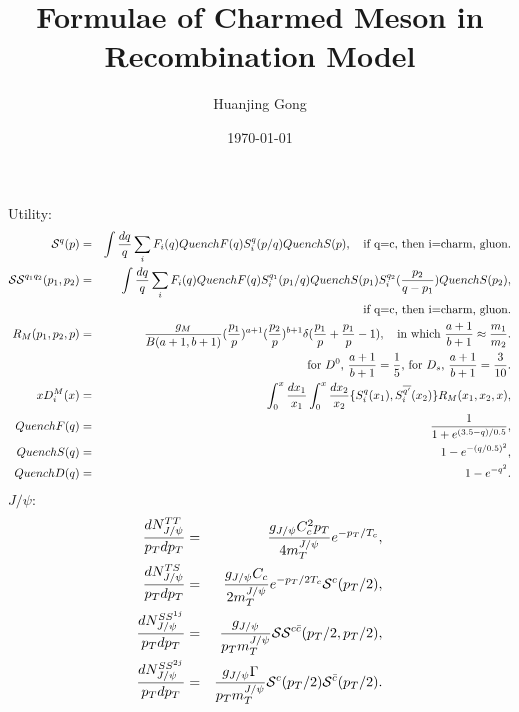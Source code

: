 \documentclass[onecolumn,aps,superscriptaddress,nofootinbib,floatfix]{revtex4}
\begin{document}
	
	\title{Formulae of Charmed Meson in Recombination Model}
	
	\author{Huanjing Gong}
	\date{\today}
	
	
	\pacs{}
	\keywords{}
	\maketitle

	Utility:
	\begin{eqnarray}
		\mathcal{S}^q(p)&=&\int{dq\over q} \sum_{i} F_i(q) QuenchF(q) S_i^q(p/q)QuenchS(p), \quad \text{if q=c, then i=charm, gluon}.\\
		\mathcal{SS}^{q_1 q_2}(p_1,p_2)&=&\int{dq\over q}  \sum_{i} F_i(q) QuenchF(q) S_i^{q_1}(p_1/q)QuenchS(p_1) S_i^{q_2}({p_2 \over q-p_1})QuenchS(p_2), \\
		&& \text{if q=c, then i=charm, gluon}.\nonumber \\
		R_M(p_1,p_2,p)&=&{g_M \over B(a+1,b+1)}({p_1 \over p})^{a+1} ({p_2 \over p})^{b+1} \delta({p_1 \over p}+{p_1 \over p}-1),\quad \text{in which }{a+1 \over b+1}\approx {m_1 \over m_2}. \\
		&& \text{for $D^0$, ${a+1 \over b+1}={1\over 5}$, for $D_s$, ${a+1 \over b+1}={3\over 10}$}.\nonumber \\
		xD_i^M(x)&=&\int_0^x {dx_1 \over x_1}\int_0^x {dx_2 \over x_2} \{S_i^q(x_1),S_i^{\overline{q'}} (x_2)\}R_M(x_1,x_2,x),\\
		QuenchF(q)&=&{1 \over 1+e^{(3.5-q)/0.5}},\\
		QuenchS(q)&=&1-e^{-(q/0.5)^2},\\
		QuenchD(q)&=&1-e^{-q^2}.
	\end{eqnarray}
	$J/\psi$:
	\begin{eqnarray}
		\frac{dN^{TT}_{J/\psi}}{p_Tdp_T}&=&{g_{J/\psi}C_c^2 p_T \over 4m_T^{J/\psi}}e^{-p_T/T_c}, \\
		\frac{dN^{TS}_{J/\psi}}{p_Tdp_T}&=&{g_{J/\psi}C_c \over 2m_T^{J/\psi}}e^{-p_T/2T_c}\mathcal{S}^c(p_T/2),\\
		\frac{dN^{SS^{1j}}_{J/\psi}}{p_Tdp_T}&=&{g_{J/\psi} \over p_T m_T^{J/\psi}}\mathcal{SS}^{c \bar{c}}(p_T/2,p_T/2),\\
		\frac{dN^{SS^{2j}}_{J/\psi}}{p_Tdp_T}&=&{g_{J/\psi}\Gamma \over p_T m_T^{J/\psi}}\mathcal{S}^c(p_T/2)\mathcal{S}^{\bar{c}}(p_T/2).
	\end{eqnarray}
\end{document}
